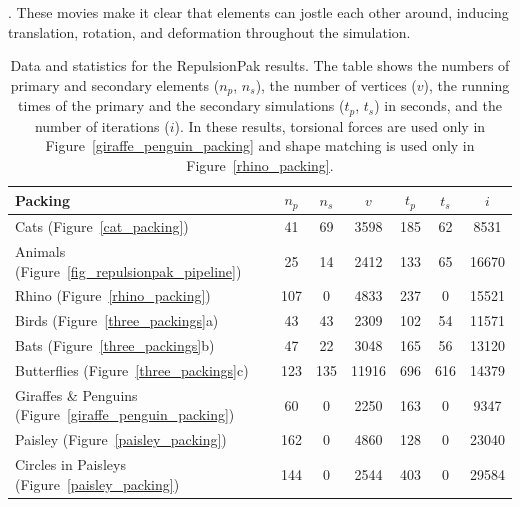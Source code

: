 .  
These movies make it clear that elements can jostle each other
around, inducing translation, rotation, and deformation throughout the 
simulation.

\begin{table}
\centering 
\caption[Data and statistics for the RepulsionPak results]
{
   Data and statistics for the RepulsionPak results.  The table shows the
   numbers of primary and secondary elements ($n_p$, $n_s$),
   the number of vertices ($v$), 
   the running times of the primary and the secondary simulations ($t_p$, $t_s$) in seconds,
   and the number of iterations ($i$).
   In these results, torsional forces are used only in 
   Figure~\ref{giraffe_penguin_packing} and shape matching is used only 
   in Figure~\ref{rhino_packing}.
   }
\label{packing_statistics}
\begin{tabular}{|l|c|c|c|c|c|c|}
\hline
\cellcolor{lg}Packing                  & \cellcolor{lg}$n_p$ & \cellcolor{lg}$n_s$ & \cellcolor{lg}$v$   & \cellcolor{lg}$t_p$ & \cellcolor{lg}$t_s$ & \cellcolor{lg}$i$\\ \hline
Cats (Figure~\ref{cat_packing})                       & 41    & 69   & 3598  & 185  & 62  & 8531\\ \hline
Animals (Figure~\ref{fig_repulsionpak_pipeline})                       & 25    & 14   & 2412  & 133  & 65  & 16670\\ \hline
Rhino   (Figure~\ref{rhino_packing})        & 107   & 0    & 4833  & 237  & 0   & 15521\\ \hline
Birds  (Figure~\ref{three_packings}a)                 & 43    & 43   & 2309  & 102  & 54  & 11571\\ \hline
Bats (Figure~\ref{three_packings}b)                   & 47    & 22   & 3048  & 165  & 56  & 13120\\ \hline
Butterflies (Figure~\ref{three_packings}c)            & 123   & 135  & 11916 & 696  & 616 & 14379\\ \hline
Giraffes \& Penguins (Figure~\ref{giraffe_penguin_packing})        & 60    & 0   & 2250  & 163  & 0   & 9347\\ \hline
Paisley (Figure~\ref{paisley_packing})      & 162   & 0    & 4860  & 128  & 0   & 23040\\ \hline
Circles in Paisleys (Figure~\ref{paisley_packing})      & 144   & 0    & 2544  & 403  & 0   & 29584\\ \hline
\end{tabular}
\end{table}


